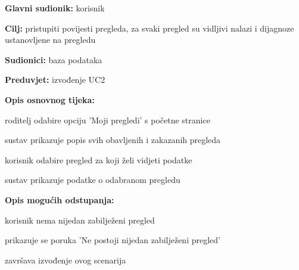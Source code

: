                      \noindent {}
					\begin{packed_item}
	
						\item \textbf{Glavni sudionik: }korisnik
						\item  \textbf{Cilj:} pristupiti povijesti pregleda, za svaki pregled su vidljivi nalazi i dijagnoze ustanovljene na pregledu
						\item  \textbf{Sudionici:} baza podataka
						\item  \textbf{Preduvjet:} izvođenje UC2
						\item  \textbf{Opis osnovnog tijeka:}
						
						\item[] \begin{packed_enum}
	
							\item roditelj odabire opciju 'Moji pregledi' s početne stranice
							\item sustav prikazuje popis svih obavljenih i zakazanih pregleda
							\item korisnik odabire pregled za koji želi vidjeti podatke
							\item sustav prikazuje podatke o odabranom pregledu
							
						\end{packed_enum}
						\item  \textbf{Opis mogućih odstupanja:}
						
						\item[] \begin{packed_item}
							\item[2.a] korisnik nema nijedan zabilježeni pregled
							\item[] 
							\begin{packed_enum} 
								\item prikazuje se poruka 'Ne postoji nijedan zabilježeni pregled'
								\item završava izvođenje ovog scenarija
								
							\end{packed_enum}
						\end{packed_item}
					\end{packed_item}


